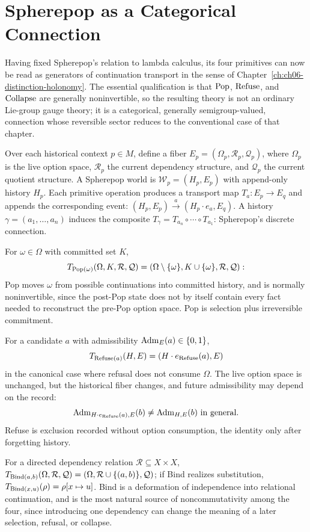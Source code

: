 \section{Spherepop as a Categorical Connection}

Having fixed Spherepop's relation to lambda calculus, its four primitives can now be read as generators of continuation transport in the sense of Chapter~\ref{ch:ch06-distinction-holonomy}. The essential qualification is that $\mathrm{Pop}$, $\mathrm{Refuse}$, and $\mathrm{Collapse}$ are generally noninvertible, so the resulting theory is not an ordinary Lie-group gauge theory; it is a categorical, generally semigroup-valued, connection whose reversible sector reduces to the conventional case of that chapter.

Over each historical context $p \in M$, define a fiber $E_p = (\Omega_p, \mathcal{R}_p, \mathcal{Q}_p)$, where $\Omega_p$ is the live option space, $\mathcal{R}_p$ the current dependency structure, and $\mathcal{Q}_p$ the current quotient structure. A Spherepop world is $\mathcal{W}_p = (H_p, E_p)$ with append-only history $H_p$. Each primitive operation produces a transport map $T_a : E_p \to E_q$ and appends the corresponding event: $(H_p, E_p) \xrightarrow{a} (H_p \cdot e_a, E_q)$. A history $\gamma = (a_1, \ldots, a_n)$ induces the composite $T_\gamma = T_{a_n} \circ \cdots \circ T_{a_1}$: Spherepop's discrete connection.

For $\omega \in \Omega$ with committed set $K$,
\[
T_{\mathrm{Pop}(\omega)}(\Omega,K,\mathcal{R},\mathcal{Q}) = (\Omega \setminus \{\omega\}, K \cup \{\omega\}, \mathcal{R}, \mathcal{Q}):
\]
Pop moves $\omega$ from possible continuations into committed history, and is normally noninvertible, since the post-Pop state does not by itself contain every fact needed to reconstruct the pre-Pop option space. Pop is selection plus irreversible commitment.

For a candidate $a$ with admissibility $\operatorname{Adm}_E(a) \in \{0,1\}$,
\[
T_{\mathrm{Refuse}(a)}(H,E) = (H \cdot e_{\mathrm{Refuse}}(a), E)
\]
in the canonical case where refusal does not consume $\Omega$. The live option space is unchanged, but the historical fiber changes, and future admissibility may depend on the record:
\[
\operatorname{Adm}_{H \cdot e_{\mathrm{Refuse}}(a), E}(b) \neq \operatorname{Adm}_{H,E}(b) \text{ in general}.
\]
Refuse is exclusion recorded without option consumption, the identity only after forgetting history.

For a directed dependency relation $\mathcal{R} \subseteq X \times X$, $T_{\mathrm{Bind}(a,b)}(\Omega,\mathcal{R},\mathcal{Q}) = (\Omega, \mathcal{R} \cup \{(a,b)\}, \mathcal{Q})$; if Bind realizes substitution, $T_{\mathrm{Bind}(x,u)}(\rho) = \rho[x \mapsto u]$. Bind is a deformation of independence into relational continuation, and is the most natural source of noncommutativity among the four, since introducing one dependency can change the meaning of a later selection, refusal, or collapse.

